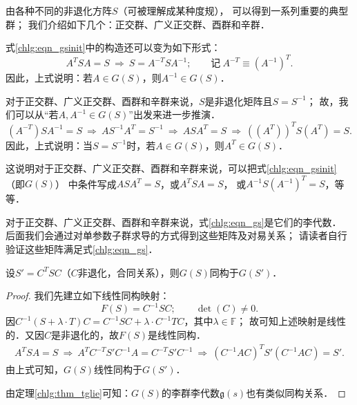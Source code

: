 由各种不同的非退化方阵$S$（可被理解成某种度规），
可以得到一系列重要的典型群；
我们介绍如下几个：正交群、广义正交群、酉群和辛群．

式\eqref{chlg:eqn_gsinit}中的构造还可以变为如下形式：
\begin{equation}\label{chlg:eqn_invaings}
    A^T S {A} =S \ \Rightarrow \ S = A^{-T} S {A^{-1}} ; \qquad
    \text{记}\  A^{-T}\equiv ({A^{-1}})^T .
\end{equation}
因此，上式说明：若$A\in G(S)$，则$A^{-1} \in G(S)$．


对于正交群、广义正交群、酉群和辛群来说，$S$是非退化矩阵且$S=S^{-1}$；
故，我们可以从“若$A, A^{-1}\in G(S)$”出发来进一步推演．
\begin{equation*} %
    (A^{-T}) S {A^{-1}} =S \ \Rightarrow \ 
    {A} S^{-1} A^T = S^{-1} \ \Rightarrow \ {A} S A^T = S
    \ \Rightarrow \  \left({({A}^T)}\right)^T S ({A}^T) = S .
\end{equation*}
因此，上式说明：当$S=S^{-1}$时，若$A\in G(S)$，则${A}^T \in G(S)$．

这说明对于正交群、广义正交群、酉群和辛群来说，可以把式\eqref{chlg:eqn_gsinit}（即$G(S)$）
中条件写成$ A S {A}^T =S$，或$ {A}^T S A =S$，
或$  A^{-1} S ({A^{-1}})^T =S$，等等．

对于正交群、广义正交群、酉群和辛群来说，式\eqref{chlg:eqn_gs}是它们的李代数．
后面我们会通过对单参数子群求导的方式得到这些矩阵及对易关系；
请读者自行验证这些矩阵满足式\eqref{chlg:eqn_gs}．



\begin{proposition}
    设$S'= C^T S C $（$C$非退化，合同关系），则$G(S)$同构于$G(S')$．
\end{proposition}
\begin{proof}
    我们先建立如下线性同构映射：
    \begin{equation}
        F(S)=C^{-1}SC;\qquad \det(C)\neq 0.
    \end{equation}    
    因$C^{-1}(S+\lambda \cdot T)C= C^{-1}SC +\lambda \cdot C^{-1}TC $，其中$\lambda\in \mathbb{F}$；
    故可知上述映射是线性的．又因$C$是非退化的，故$F(S)$是线性同构．    
    \begin{align*}
        A^T S A = S \ \Rightarrow\ A^T C^{-T}S' C^{-1} A = C^{-T}S' C^{-1}
        \ \Rightarrow\ (C^{-1} A C)^{T} S' (C^{-1} A C) = S'  .
    \end{align*}
    由上式可知，$G(S)$线性同构于$G(S')$．
    
    由定理\ref{chlg:thm_tglie}可知：$G(S)$的李群李代数$\mathfrak{g}(s)$也有类似同构关系．
\end{proof}


